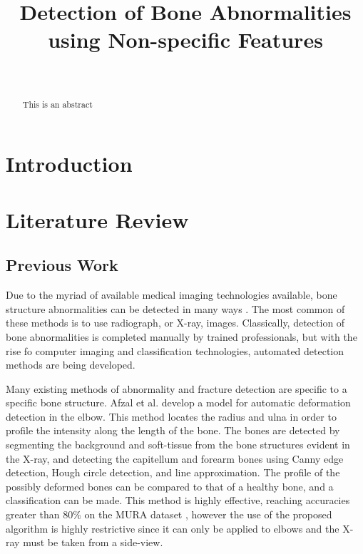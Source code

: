 \documentclass{IEEEtran}
\begin{document}
	
	\title{Detection of Bone Abnormalities using Non-specific Features}
	\author{\\
	}
	
	\maketitle
	
	\begin{abstract}
		This is an abstract
	\end{abstract}

	\section{Introduction}
	
	\section{Literature Review}
	
	\subsection{Previous Work}
	
	Due to the myriad of available medical imaging technologies available, bone structure abnormalities can be detected in many ways \cite{medlineplusmedicalencyclopedia2021}. The most common of these methods is to use radiograph, or X-ray, images. Classically, detection of bone abnormalities is completed manually by trained professionals, but with the rise fo computer imaging and classification technologies, automated detection methods are being developed.
	
	Many existing methods of abnormality and fracture detection are specific to a specific bone structure. Afzal et al. \cite{mashalafzalmmoazzamjawaidrizwanbadarbalochsanamnarejo2020} develop a model for automatic deformation detection in the elbow. This method locates the radius and ulna in order to profile the intensity along the length of the bone. The bones are detected by segmenting the background and soft-tissue from the bone structures evident in the X-ray, and detecting the capitellum and forearm bones using Canny edge detection, Hough circle detection, and line approximation. The profile of the possibly deformed bones can be compared to that of a healthy bone, and a classification can be made. This method is highly effective, reaching accuracies greater than $80\%$ on the MURA dataset \cite{rajpurkar2017mura}, however the use of the proposed algorithm is highly restrictive since it can only be applied to elbows and the X-ray must be taken from a side-view.
	
\end{document}
